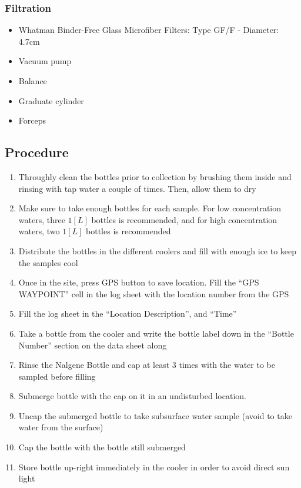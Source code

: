 \begin{appendices}
\subsubsection*{Filtration}
\begin{itemize}[itemsep=2pt,parsep=2pt]
  \item Whatman Binder-Free Glass Microfiber Filters: Type GF/F - Diameter: 4.7cm
  \item Vacuum pump
  \item Balance
  \item Graduate cylinder
  \item Forceps
\end{itemize}

\subsection{Procedure}
\begin{enumerate}[itemsep=2pt,parsep=2pt]
  \item Throughly clean the bottles prior to collection by brushing them inside and rinsing with tap water a couple of times. Then, allow them to dry
  \item Make sure to take enough bottles for each sample. For low concentration waters, three $1[L]$ bottles is recommended, and for high concentration waters, two $1[L]$ bottles is recommended
  \item Distribute the bottles in the different coolers and fill with enough ice to keep the samples cool
  \item Once in the site, press GPS button to save location. Fill the ``GPS WAYPOINT'' cell in the log sheet with the location number from the GPS
  \item Fill the log sheet in the ``Location Description'', and ``Time''
  \item Take a bottle from the cooler and write the bottle label down in the ``Bottle Number'' section on the data sheet along
  \item Rinse the Nalgene Bottle and cap at least 3 times with the water to be sampled before filling
  \item Submerge bottle with the cap on it in an undisturbed location.
  \item Uncap the submerged bottle  to take subsurface water sample (avoid to take water from the surface) \citep{Montana08} 
  \item Cap the bottle with the bottle still submerged
  \item Store bottle up-right immediately in the cooler in order to avoid direct sun light \citep{Mueller1995}

\end{enumerate}
\end{appendices}
